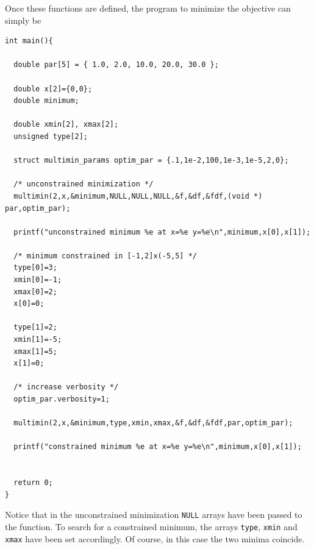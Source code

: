 \documentclass[11pt]{article}
\begin{document}
Once these functions are defined, the program to minimize the
objective can simply be
\begin{verbatim}
int main(){
  
  double par[5] = { 1.0, 2.0, 10.0, 20.0, 30.0 };
  
  double x[2]={0,0};
  double minimum;
  
  double xmin[2], xmax[2];
  unsigned type[2];
  
  struct multimin_params optim_par = {.1,1e-2,100,1e-3,1e-5,2,0};
  
  /* unconstrained minimization */
  multimin(2,x,&minimum,NULL,NULL,NULL,&f,&df,&fdf,(void *) par,optim_par);
  
  printf("unconstrained minimum %e at x=%e y=%e\n",minimum,x[0],x[1]);
  
  /* minimum constrained in [-1,2]x(-5,5] */
  type[0]=3;
  xmin[0]=-1;
  xmax[0]=2;
  x[0]=0;

  type[1]=2;
  xmin[1]=-5;
  xmax[1]=5;
  x[1]=0;

  /* increase verbosity */
  optim_par.verbosity=1;

  multimin(2,x,&minimum,type,xmin,xmax,&f,&df,&fdf,par,optim_par);
  
  printf("constrained minimum %e at x=%e y=%e\n",minimum,x[0],x[1]);
  
  
  return 0;
}
\end{verbatim}
Notice that in the unconstrained minimization \texttt{NULL} arrays have been
passed to the function. To search for a constrained minimum, the
arrays \texttt{type}, \texttt{xmin} and \texttt{xmax} have been set accordingly. Of course,
in this case the two minima coincide.
\end{document}
